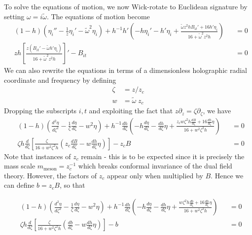 \documentclass[aps,preprint,nofootinbib,preprintnumbers,eqsecnum,superscriptaddress]{revtex4}
\begin{document}
To solve the equations of motion, we now Wick-rotate to Euclidean signature by setting $\omega = i \tilde{\omega}$. The equations of motion become
\begin{subequations}
	\begin{alignat}{2}
		&	(1-h) \left(\eta_i'' - \frac{1}{z} \eta_i' - \tilde{\omega}^2 \eta_i \right) + h^{-1}h' \left(-h \eta_i' - h' \eta_i + \frac{\tilde{\omega} z^2 h B_{it}' + 16h' \eta_i}{16 + \tilde{\omega}^2 z^2 h}\right) && = 0	\\
		&	zh \left[\frac{z(B_{it}' - \tilde{\omega} h' \eta_i)}{16 + \tilde{\omega}^2 z^2 h} \right]' - B_{it} && = 0
	\end{alignat}
\end{subequations}
We can also rewrite the equations in terms of a dimensionless holographic radial coordinate and frequency by defining
\begin{subequations}
	\begin{align}
		\zeta	& = z/z_c					\label{zeta-def}	\\	
		w		& = \tilde{\omega} \;  z_c	\label{w-def}
	\end{align}
\end{subequations}
Dropping the subscripts $i,t$ and exploiting the fact that $z \partial_z = \zeta \partial_\zeta$, we have
\begin{subequations}
	\begin{alignat}{2}
		&	(1-h) \left(\frac{d^2 \eta}{d\zeta^2} - \frac{1}{\zeta}\frac{d\eta}{d\zeta} - w^2 \eta \right)
		+ h^{-1} \frac{dh}{d\zeta} \left(-h \frac{d\eta}{d\zeta} - \frac{dh}{d\zeta} \eta
		+  \frac{z_c w \zeta^2 h \frac{dB}{d\zeta} + 16  \frac{dh}{d\zeta} \eta}{16 +  w^2 \zeta^2 h}\right) && = 0	\\
		&	\zeta h \frac{d}{d \zeta} \left[\frac{\zeta }{16 + w^2 \zeta^2 h} \left(z_c \frac{dB}{d\zeta} - w \frac{dh}{d\zeta} \eta\right) \right] - z_c B && = 0
	\end{alignat}
\end{subequations}
Note that instances of $z_c$ remain - this is to be expected since it is precisely the mass scale $m_{\text{meson}} = z_c^{-1}$ which breaks conformal invariance of the dual field theory. However, the factors of $z_c$ appear only when multiplied by $B$. Hence we can define $b = z_c B$, so that

\begin{subequations}
	\begin{alignat}{2}
		&	(1-h) \left(\frac{d^2 \eta}{d\zeta^2} - \frac{1}{\zeta}\frac{d\eta}{d\zeta} - w^2 \eta \right)
		+ h^{-1} \frac{dh}{d\zeta} \left(-h \frac{d\eta}{d\zeta} - \frac{dh}{d\zeta} \eta
		+  \frac{w \zeta^2 h \frac{db}{d\zeta} + 16  \frac{dh}{d\zeta} \eta}{16 +  w^2 \zeta^2 h}\right) && = 0	\\
		&	\zeta h \frac{d}{d \zeta} \left[\frac{\zeta }{16 + w^2 \zeta^2 h} \left(\frac{db}{d\zeta} - w \frac{dh}{d\zeta} \eta\right) \right] - b && = 0
	\end{alignat}
\end{subequations}
\end{document}
